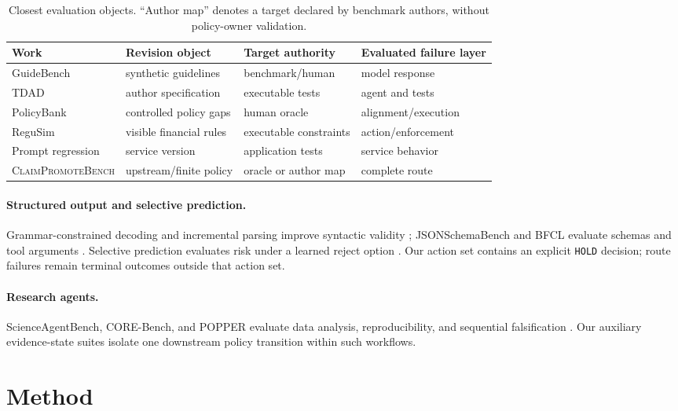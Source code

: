 \documentclass[10pt]{article}
\newcommand{\cpb}{\textsc{ClaimPromoteBench}\xspace}
\newcommand{\hold}{\texttt{HOLD}}
\begin{document}
\begin{table}[t]
\centering
\footnotesize
\setlength{\tabcolsep}{3.2pt}
\caption{Closest evaluation objects. ``Author map'' denotes a target declared by benchmark authors,
without policy-owner validation.}
\label{tab:related-matrix}
\begin{tabular}{@{}llll@{}}
\toprule
Work & Revision object & Target authority & Evaluated failure layer \\
\midrule
GuideBench & synthetic guidelines & benchmark/human & model response \\
TDAD & author specification & executable tests & agent and tests \\
PolicyBank & controlled policy gaps & human oracle & alignment/execution \\
ReguSim & visible financial rules & executable constraints & action/enforcement \\
Prompt regression & service version & application tests & service behavior \\
\cpb & upstream/finite policy & oracle or author map & complete route \\
\bottomrule
\end{tabular}
\end{table}

\paragraph{Structured output and selective prediction.}
Grammar-constrained decoding and incremental parsing improve syntactic validity
\cite{scholak2021picard,geng2023grammar}; JSONSchemaBench and BFCL evaluate schemas and tool
arguments \cite{geng2025jsonschemabench,patil2025bfcl}. Selective prediction evaluates risk under a
learned reject option \cite{geifman2017selective,geifman2019selectivenet}. Our action set contains an
explicit \hold{} decision; route failures remain terminal outcomes outside that action set.

\paragraph{Research agents.}
ScienceAgentBench, CORE-Bench, and POPPER evaluate data analysis, reproducibility, and sequential
falsification \cite{chen2025scienceagentbench,siegel2025corebench,huang2025popper}. Our auxiliary
evidence-state suites isolate one downstream policy transition within such workflows.

\section{Method}
\end{document}
